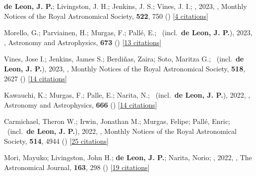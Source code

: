 \item[{\color{numcolor}\scriptsize51}] \textbf{de Leon, J. P.}; Livingston, J. H.; Jenkins, J. S.; Vines, J. I.; \etal, 2023, , Monthly Notices of the Royal Astronomical Society, \textbf{522}, 750 () [\href{https://ui.adsabs.harvard.edu/abs/2023MNRAS.522..750D}{4 citations}]

\item[{\color{numcolor}\scriptsize50}] Morello, G.; Parviainen, H.; Murgas, F.; Pall{\'e}, E.; \etal\ (incl.\ \textbf{de Leon, J. P.}), 2023, , Astronomy and Astrophysics, \textbf{673} () [\href{https://ui.adsabs.harvard.edu/abs/2023A&A...673A..32M}{13 citations}]

\item[{\color{numcolor}\scriptsize49}] Vines, Jose I.; Jenkins, James S.; Berdi{\~n}as, Zaira; Soto, Maritza G.; \etal\ (incl.\ \textbf{de Leon, J. P.}), 2023, , Monthly Notices of the Royal Astronomical Society, \textbf{518}, 2627 () [\href{https://ui.adsabs.harvard.edu/abs/2023MNRAS.518.2627V}{14 citations}]

\item[{\color{numcolor}\scriptsize48}] Kawauchi, K.; Murgas, F.; Palle, E.; Narita, N.; \etal\ (incl.\ \textbf{de Leon, J. P.}), 2022, , Astronomy and Astrophysics, \textbf{666} () [\href{https://ui.adsabs.harvard.edu/abs/2022A&A...666A...4K}{14 citations}]

\item[{\color{numcolor}\scriptsize47}] Carmichael, Theron W.; Irwin, Jonathan M.; Murgas, Felipe; Pall{\'e}, Enric; \etal\ (incl.\ \textbf{de Leon, J. P.}), 2022, , Monthly Notices of the Royal Astronomical Society, \textbf{514}, 4944 () [\href{https://ui.adsabs.harvard.edu/abs/2022MNRAS.514.4944C}{25 citations}]

\item[{\color{numcolor}\scriptsize46}] Mori, Mayuko; Livingston, John H.; \textbf{de Leon, J. P.}; Narita, Norio; \etal, 2022, , The Astronomical Journal, \textbf{163}, 298 () [\href{https://ui.adsabs.harvard.edu/abs/2022AJ....163..298M}{19 citations}]

